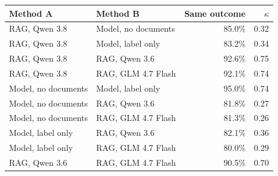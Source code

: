 \begin{tabular}{llrr}
\toprule
Method A & Method B & Same outcome & $\kappa$ \\
\midrule
RAG, Qwen 3.8 & Model, no documents & 85.0\% & 0.32 \\
RAG, Qwen 3.8 & Model, label only & 83.2\% & 0.34 \\
RAG, Qwen 3.8 & RAG, Qwen 3.6 & 92.6\% & 0.75 \\
RAG, Qwen 3.8 & RAG, GLM 4.7 Flash & 92.1\% & 0.74 \\
Model, no documents & Model, label only & 95.0\% & 0.74 \\
Model, no documents & RAG, Qwen 3.6 & 81.8\% & 0.27 \\
Model, no documents & RAG, GLM 4.7 Flash & 81.3\% & 0.26 \\
Model, label only & RAG, Qwen 3.6 & 82.1\% & 0.36 \\
Model, label only & RAG, GLM 4.7 Flash & 80.0\% & 0.29 \\
RAG, Qwen 3.6 & RAG, GLM 4.7 Flash & 90.5\% & 0.70 \\
\bottomrule
\end{tabular}
